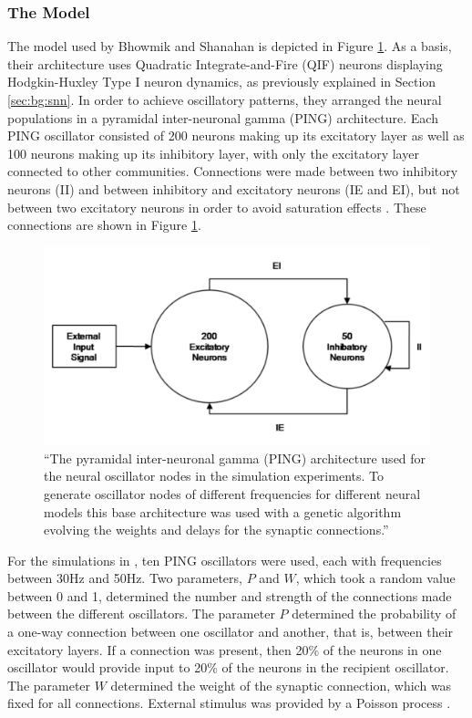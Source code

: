 \documentclass[a4paper,11pt]{article}
\begin{document}
\subsubsection{The Model}
\label{sec:snn:mod}

The model used by Bhowmik and Shanahan is depicted in Figure \ref{Bhowmik2013_Schema}. As a basis, their architecture uses Quadratic Integrate-and-Fire (QIF) neurons displaying Hodgkin-Huxley Type I neuron dynamics, as previously explained in Section \ref{sec:bg:snn}.  In order to achieve oscillatory patterns, they arranged the neural populations in a pyramidal inter-neuronal gamma (PING) architecture. Each PING oscillator consisted of 200 neurons making up its excitatory layer as well as 100 neurons making up its inhibitory layer, with only the excitatory layer connected to other communities. Connections were made between two inhibitory neurons (II) and between inhibitory and excitatory neurons (IE and EI), but not between two excitatory neurons in order to avoid saturation effects \cite{Bhowmik 2013}. These connections are shown in Figure \ref{Bhowmik2013_Schema}.

\begin{figure}[H]
\centering
\includegraphics[scale = 0.75]{Bhowmik2013_Schema}
\caption{``The pyramidal inter-neuronal gamma (PING) architecture used for the neural oscillator nodes in the simulation experiments. To generate oscillator nodes of different frequencies for different neural models this base architecture was used with a genetic algorithm evolving the weights and delays for the synaptic connections.'' \cite{Bhowmik2013}}
\label{Bhowmik2013_Schema}
\end{figure}

For the simulations in \cite{Bhowmik2013}, ten PING oscillators were used, each with frequencies between 30Hz and 50Hz. Two parameters, $P$ and $W$, which took a random value between 0 and 1, determined the number and strength of the connections made between the different oscillators. The parameter $P$ determined the probability of a one-way connection between one oscillator and another, that is, between their excitatory layers. If a connection was present, then 20\% of the neurons in one oscillator would provide input to 20\% of the neurons in the recipient oscillator. The parameter $W$ determined the weight of the synaptic connection, which was fixed for all connections. External stimulus was provided by a Poisson process \cite{Bhowmik2013}.
\end{document}
